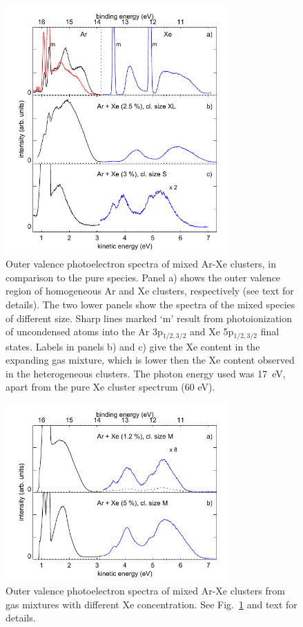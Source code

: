 \begin{figure}[ht]
 \centering
 \includegraphics[width=8.5cm]{pics/figure_oval_1.pdf}
 \caption{
Outer valence photoelectron spectra of mixed Ar-Xe clusters, in comparison to the pure species. Panel a) shows the outer valence region of homogeneous Ar and Xe clusters, respectively (see text for details). The two lower panels show the spectra of the mixed species of different size. Sharp lines marked `m' result from photoionization of uncondensed atoms into the Ar 3p$_{1/2,3/2}$ and Xe 5p$_{1/2,3/2}$ final states. Labels in panels b) and c) give the Xe content in the expanding gas mixture, which is lower then the Xe content observed in the heterogeneous clusters. The photon energy used was 17~eV, apart from the pure Xe cluster spectrum (60 eV).
}
 \label{figure:oval1}
\end{figure}


\begin{figure}[ht]
 \centering
 \includegraphics[width=8.5cm]{pics/figure_oval_2.pdf}
 \caption{
Outer valence photoelectron spectra of mixed Ar-Xe clusters from gas mixtures with different Xe concentration. See Fig.\ \ref{figure:oval1} and text for details.
}
 \label{figure:oval2}
\end{figure}



